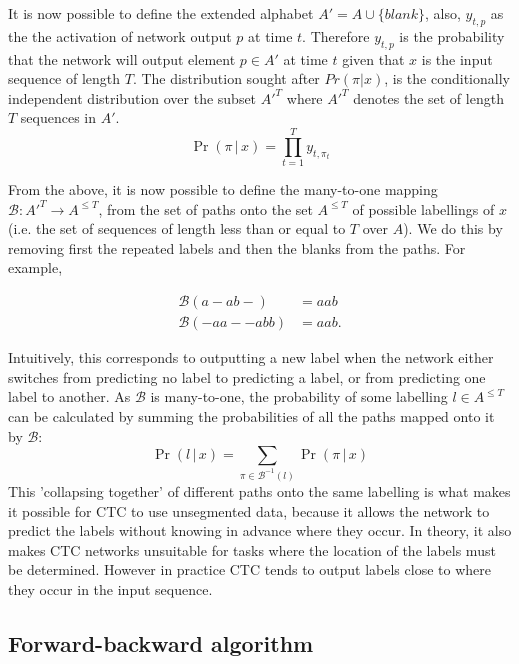 It is now possible to define the extended alphabet $A' = A \cup \{blank\}$, also, $y_{t,p}$ as the the activation of network output $p$ at time $t$.  Therefore $y_{t,p}$  is the probability that the network will output element $p \in A'$ at time $t$ given that $x$ is the input sequence of length $T$.  The distribution sought after $Pr(\pi|x)$, is the conditionally independent distribution over the subset $A'^T$ where $A'^T$ denotes the set of length $T$ sequences in $A'$. 
\begin{equation}
\Pr( \pi \, | \, x ) = \prod_{t=1}^{T} y_{t,\pi_t}
\label{eqn_c3_ctc01}\end{equation}

From the above, it is now possible to define the many-to-one mapping $\mathcal{B} : A'^T \rightarrow A^{\le T}$, from the set of paths onto the set $A^{\le T}$ of possible labellings of $x$ (i.e. the set of sequences of length less than or equal to $T$ over $A$). We do this by removing first the repeated labels and then the blanks from the paths. For example,

\begin{equation}\begin{aligned}\mathcal{B}(a - ab-) &= aab \\ \mathcal{B}(-aa - -abb) &= aab.\end{aligned} \label{eqn_c3_ctc02}
\end{equation}

Intuitively, this corresponds to outputting a new label when the network either switches from predicting no label to predicting a label, or from predicting one label to another. As $\mathcal{B}$ is many-to-one, the probability of some labelling $l \in A^{\le T}$ can be calculated by summing the probabilities of all the paths mapped onto it by $\mathcal{B}$:
\begin{equation}
\Pr( l \, | \, x) = \sum_{\pi \in \mathcal{B}^{-1}(l)} \Pr( \pi \, | \, x)
\label{eqn_c3_ct03}\end{equation}
This 'collapsing together' of different paths onto the same labelling is what makes it possible for CTC to use unsegmented data, because it allows the network to predict the labels without knowing in advance where they occur. In theory, it also makes CTC networks unsuitable for tasks where the location of the labels must be determined. However in practice CTC tends to output labels close to where they occur in the input sequence.

\subsection{Forward-backward algorithm}

